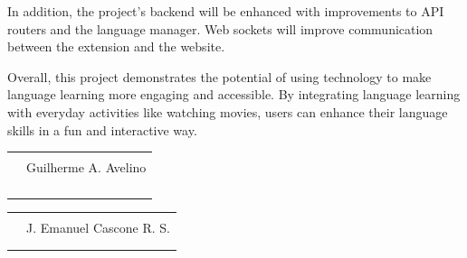 \documentclass[12pt]{article}
\begin{document}
In addition, the project's backend will be enhanced with improvements to API routers and the language manager. Web sockets will improve communication between the extension and the website.

Overall, this project demonstrates the potential of using technology to make language learning more engaging and accessible. By integrating language learning with everyday activities like watching movies, users can enhance their language skills in a fun and interactive way.




\centering
\break
\break

\begin{tabular}{@{}p{.5in}p{4in}@{}}
& \hrulefill \\
& \centerline{Guilherme A. Avelino} \\
\\ \\ \\ \\ 
\end{tabular}

\centering
\begin{tabular}{@{}p{.5in}p{4in}@{}}
& \hrulefill \\
& \centerline{J. Emanuel Cascone R. S.} \\
\\ \\
\end{tabular}
\end{document}
